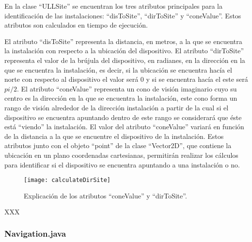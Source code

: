 





En la clase ``ULLSite'' se encuentran los tres atributos principales para la identificación de las instalaciones: ``disToSite'', ``dirToSite'' y ``coneValue''. Estos atributos son calculados en tiempo de ejecución.

El atributo ``disToSite'' representa la distancia, en metros, a la que se encuentra la instalación con respecto a la ubicación del dispositivo. El atributo ``dirToSite'' representa el valor de la brújula del dispositivo, en radianes, en la dirección en la que se encuentra la instalación, es decir, si la ubicación se encuentra hacía el norte con respecto al dispositivo el valor será 0 y si se encuentra hacía el este será $pi/2$.
El atributo ``coneValue'' representa un cono de visión imaginario cuyo su centro es la dirección en la que se encuentra la instalación, este cono forma un rango de visión alrededor de la dirección instalación a partir de la cual si el dispositivo se encuentra apuntando dentro de este rango se considerará que éste está ``viendo'' la instalación. El valor del atributo ``coneValue'' variará en función de la distancia a la que se encuentre el dispositivo de la instalación.  Estos atributos junto con el objeto ``point'' de la clase ``Vector2D'', que contiene la ubicación en un plano coordenadas cartesianas, permitirán realizar los cálculos para identificar si el dispositivo se encuentra apuntando a una instalación o no.


\begin{figure}[h] 
    \centering
    \texttt{[image: calculateDirSite]}
    \caption{Explicación de los atributos ``coneValue'' y ``dirToSite''.}
    \label{fig:dirSite}
\end{figure}
XXX
  
\subsubsection{Navigation.java}

